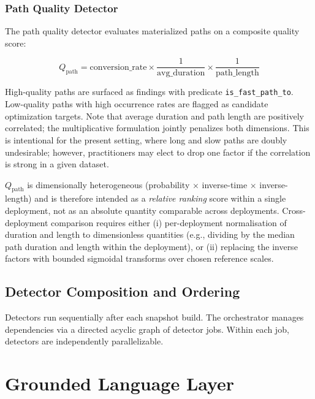 \documentclass[12pt, a4paper]{article}
\begin{document}
\subsubsection{Path Quality Detector}

The path quality detector evaluates materialized paths on a composite quality score:

\begin{equation}
  Q_{\text{path}} = \text{conversion\_rate} \times \frac{1}{\text{avg\_duration}} \times \frac{1}{\text{path\_length}}
  \label{eq:pathquality}
\end{equation}

High-quality paths are surfaced as findings with predicate \texttt{is\_fast\_path\_to}. Low-quality paths with high occurrence rates are flagged as candidate optimization targets. Note that average duration and path length are positively correlated; the multiplicative formulation jointly penalizes both dimensions. This is intentional for the present setting, where long and slow paths are doubly undesirable; however, practitioners may elect to drop one factor if the correlation is strong in a given dataset.

$Q_{\text{path}}$ is dimensionally heterogeneous (probability $\times$ inverse-time $\times$ inverse-length) and is therefore intended as a \emph{relative ranking} score within a single deployment, not as an absolute quantity comparable across deployments. Cross-deployment comparison requires either (i) per-deployment normalisation of duration and length to dimensionless quantities (e.g., dividing by the median path duration and length within the deployment), or (ii) replacing the inverse factors with bounded sigmoidal transforms over chosen reference scales.

\subsection{Detector Composition and Ordering}

Detectors run sequentially after each snapshot build. The orchestrator manages dependencies via a directed acyclic graph of detector jobs. Within each job, detectors are independently parallelizable.

\section{Grounded Language Layer}
\label{sec:gll}
\end{document}
